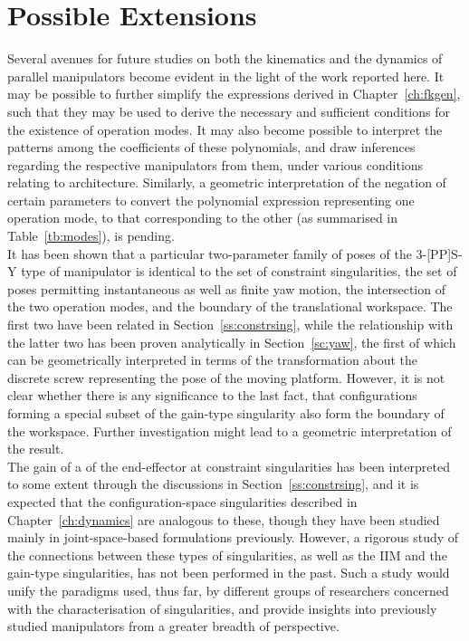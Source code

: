 \documentclass[DD]{iitmdiss}
\newcommand{\mref}[1]{\ref{#1}}
\begin{document}
\section{Possible Extensions}
Several avenues for future studies on both the kinematics and the dynamics of parallel manipulators become evident in the light of the work reported here. It may be possible to further simplify the expressions derived in Chapter~\mref{ch:fkgen}, such that they may be used to derive the necessary and sufficient conditions for the existence of operation modes. It may also become possible to interpret the patterns among the coefficients of these polynomials, and draw inferences regarding the respective manipulators from them, under various conditions relating to architecture. Similarly, a geometric interpretation of the negation of certain parameters to convert the polynomial expression representing one operation mode, to that corresponding to the other (as summarised in Table~\mref{tb:modes}), is pending. \\
It has been shown that a particular two-parameter family of poses of the 3-[PP]S-Y type of manipulator is identical to the set of constraint singularities, the set of poses permitting instantaneous as well as finite yaw motion, the intersection of the two operation modes, and the boundary of the translational workspace. The first two have been related in Section~\mref{ss:constrsing}, while the relationship with the latter two has been proven analytically in Section~\mref{sc:yaw}, the first of which can be geometrically interpreted in terms of the transformation about the discrete screw representing the pose of the moving platform. However, it is not clear whether there is any significance to the last fact, that configurations forming a special subset of the gain-type singularity also form the boundary of the workspace. Further investigation might lead to a geometric interpretation of the result.\\
The gain of a \dof of the end-effector at constraint singularities has been interpreted to some extent through the discussions in Section~\mref{ss:constrsing}, and it is expected that the configuration-space singularities described in Chapter~\mref{ch:dynamics} are analogous to these, though they have been studied mainly in joint-space-based formulations previously. However, a rigorous study of the connections between these types of singularities, as well as the IIM and the gain-type singularities, has not been performed in the past. Such a study would unify the paradigms used, thus far, by different groups of researchers concerned with the characterisation of singularities, and provide insights into previously studied manipulators from a greater breadth of perspective.\\
%
\appendix
%
\end{document}
